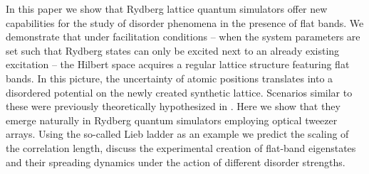 \documentclass[prl,aps,twocolumn,showpacs,superscriptaddress,longbibliography]{revtex4-1}
\begin{document}
In this paper we show that Rydberg lattice quantum simulators \cite{Schauss_2015,Labuhn_2015,Bernien2017} offer new capabilities for the study of disorder phenomena in the presence of flat bands. We demonstrate that under facilitation conditions -- when the system parameters are set such that Rydberg states can only be excited next to an already existing excitation -- the Hilbert space acquires a regular lattice structure featuring flat bands. In this picture, the uncertainty of atomic positions translates into a disordered potential on the newly created synthetic lattice. Scenarios similar to these were previously theoretically hypothesized in \cite{Leykam2017, Bodyfelt2014}. Here we show that they emerge naturally in Rydberg quantum simulators employing optical tweezer arrays. Using the so-called Lieb ladder as an example we predict the scaling of the correlation length, discuss the experimental creation of flat-band eigenstates and their spreading dynamics under the action of different disorder strengths.
\end{document}
